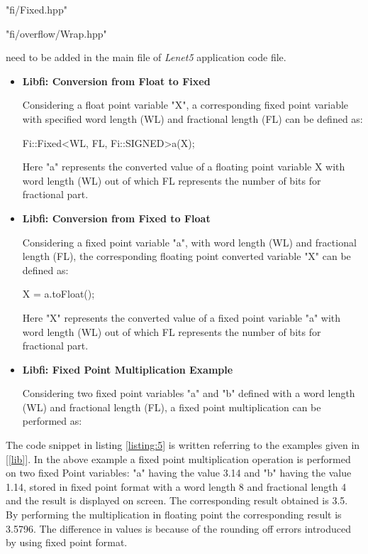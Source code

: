 \noindent "fi/Fixed.hpp"

\noindent "fi/overflow/Wrap.hpp"

\noindent need to be added in the main file of \textit{Lenet5} application code file.
\begin{itemize}
\item
\textbf{Libfi: Conversion from Float to Fixed}

\noindent Considering a float point variable "X", a corresponding fixed point variable with specified word length (WL) and fractional length (FL) can be defined as:

\hspace{3cm}Fi::Fixed\textless WL, FL, Fi::SIGNED\textgreater a(X);

\noindent Here "a" represents the converted value of a floating point variable X with word length (WL) out of which FL represents the number of bits for fractional part.
\item
\textbf{Libfi: Conversion from Fixed to Float}

\noindent Considering a fixed point variable "a", with word length (WL) and fractional length (FL), the corresponding floating point converted variable "X" can be defined as:

\hspace{3cm}X = a.toFloat();

\noindent Here "X" represents the converted value of a fixed point variable "a" with word length (WL) out of which FL represents the number of bits for fractional part.
\item
\textbf{Libfi: Fixed Point Multiplication Example}

\noindent Considering two fixed point variables "a" and "b" defined with a word length (WL) and fractional length (FL), a fixed point multiplication can be performed as:


\end{itemize}
\noindent The code snippet in listing \ref{listing:5} is written referring to the examples given in [\ref{lib}]. In the above example a fixed point multiplication operation is performed on two fixed Point variables: "a" having the value 3.14 and "b" having the value 1.14, stored in fixed point format with a word length 8 and fractional length 4 and the result is displayed on screen. The corresponding result obtained is 3.5. By performing the multiplication in floating point the corresponding result is 3.5796. The difference in values is because of the rounding off errors introduced by using fixed point format. 

